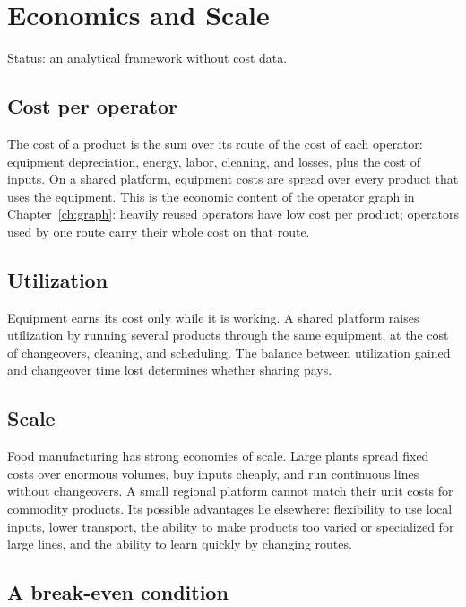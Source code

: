 \documentclass[11pt,openany]{book}
\theoremstyle{definition}
\begin{document}
\chapter{Economics and Scale}\label{ch:economics}

Status: an analytical framework without cost data.

\section{Cost per operator}

The cost of a product is the sum over its route of the cost of each operator: equipment depreciation, energy, labor, cleaning, and losses, plus the cost of inputs. On a shared platform, equipment costs are spread over every product that uses the equipment. This is the economic content of the operator graph in Chapter~\ref{ch:graph}: heavily reused operators have low cost per product; operators used by one route carry their whole cost on that route.

\section{Utilization}

Equipment earns its cost only while it is working. A shared platform raises utilization by running several products through the same equipment, at the cost of changeovers, cleaning, and scheduling. The balance between utilization gained and changeover time lost determines whether sharing pays.

\section{Scale}

Food manufacturing has strong economies of scale. Large plants spread fixed costs over enormous volumes, buy inputs cheaply, and run continuous lines without changeovers. A small regional platform cannot match their unit costs for commodity products. Its possible advantages lie elsewhere: flexibility to use local inputs, lower transport, the ability to make products too varied or specialized for large lines, and the ability to learn quickly by changing routes.

\section{A break-even condition}
\end{document}
